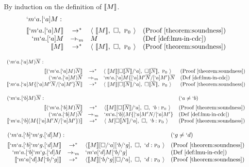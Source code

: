\begin{Proof}
By induction on the definition of $\llbracket M \rrbracket$.
\[
\begin{array}{rcllll}
\prooflabel{`m`a.[`a]M} \\
  \tr{`m`a.[`a]M} & \to^{*} & \langle\ \tr{M},\ \square,\ \gp \rangle
          & \text{(Proof \ref{theorem:soundness})} \\
  `m`a.[`a]M & \to_{`m} & M 
          & \text{(Def \ref{def:lmu-in-cdc})} \\
  \tr{M} & \to^{*} & \langle\ \tr{M},\ \square,\ \gp \rangle 
          & \text{(Proof \ref{theorem:soundness})}
\end{array}
\]

\[
\begin{array}{rclllr}
\prooflabel{(`m`a.[`a]M)\mult{N}} \\
  \tr{(`m`a.[`a]M)\mult{N}} & \to^{*} & \langle\ \tr{M}[\square\tr{\mult{N}}/`a],\ \square\tr{\mult{N}},\ \gp \rangle
          & \text{(Proof \ref{theorem:soundness})} \\
  (`m`a.[`a]M)\mult{N} & \to_{`m} & `m`a.[`a]M\{[`a]M'\mult{N}/[`a]M'\}\mult{N} 
          & \text{(Def \ref{def:lmu-in-cdc})} \\
  \tr{`m`a.[`a]M\{[`a]M'\mult{N}/[`a]M'\}\mult{N}} & \to^{*} & \langle\ \tr{M}[\square\tr{\mult{N}}/`a],\ \square\tr{\mult{N}},\ \gp \rangle
          & \text{(Proof \ref{theorem:soundness})}
\end{array}
\]

\[
\begin{array}{rcllll}
  \prooflabel{(`m`a.[`b]M)\mult{N}} & (`a \not= `b) \\
  \tr{(`m`a.[`b]M)\mult{N}} & \to^{*} & \langle \tr{M}[\square \tr{\mult{N}}/`a],\ \square,\ `b:\gp \rangle
          & \text{(Proof \ref{theorem:soundness})} \\
  (`m`a.[`b]M)\mult{N} & \to_{`m} & `m`a.[`b](M\{[`a]M'N/[`a]M'\}
          & \text{(Def \ref{def:lmu-in-cdc})} \\
  \tr{`m`a.[`b](M\{[`a]M'N/[`a]M'\})} & \to^{*} & \langle\ M[\square \tr{N}/`a],\ \square,\ `b:\gp \rangle
          & \text{(Proof \ref{theorem:soundness})}
\end{array}
\]

\[
\begin{array}{rcllll}
\prooflabel{(`m`a.[`b]`m`g.[`d]M)} & (`g \not= `d) \\
  \tr{`m`a.[`b]`m`g.[`d]M} & \to^{*} & \langle \tr{M}[\square/`a][`b/`g],\ \square,\ `d:\gp \rangle
          & \text{(Proof \ref{theorem:soundness})} \\
  `m`a.[`b]`m`g.[`d]M & \to_{`m} & `m`a[`d]M[`b/`g]
          & \text{(Def \ref{def:lmu-in-cdc})} \\
\tr{`m`a[`d]M[`b/`g]} & \to^{*} & \langle \tr{M}[`b/`g][\square/`a],\ \square,\ `d:\gp \rangle
          & \text{(Proof \ref{theorem:soundness})}
\end{array}
\]


\end{Proof}
